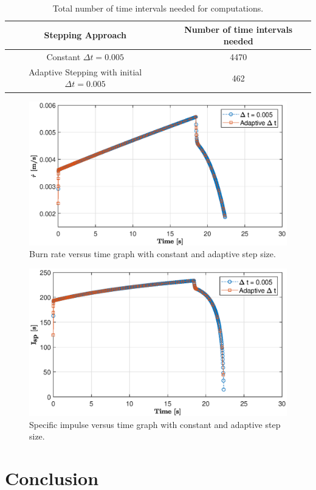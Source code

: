 \documentclass[letterpaper,12pt]{article}
\begin{document}
\begin{table}[!h]
	\begin{center}
	\caption{Total number of time intervals needed for computations.}
	\vspace{1em}
	\label{tbl:timeint}
	\begin{tabular}{|c|c|} 
	\hline
	\multicolumn{1}{|c|}{\bf{Stepping Approach}} & \multicolumn{1}{c|}{\bf{Number of time intervals needed}} \\
	\hline
	Constant $\Delta t = 0.005$ &   4470 \\ \hline
	Adaptive Stepping with initial $\Delta t = 0.005$ &   462 \\ \hline
	\end{tabular}
	\end{center}
\end{table}


\newpage

\begin{figure}[!h]
	\centering
	\includegraphics[height = 8.5 cm]{graphs/bonus_rdot.eps}
	\caption{Burn rate versus time graph with constant and adaptive step size.}
	\label{fig:bonus_rdot}
\end{figure}

\begin{figure}[!h]
	\centering
	\includegraphics[height = 8.5 cm]{graphs/bonus_isp.eps}
	\caption{Specific impulse versus time graph with constant and adaptive step size.}
	\label{fig:bonus_isp}
\end{figure}

\newpage

\section{Conclusion}

\end{document}
